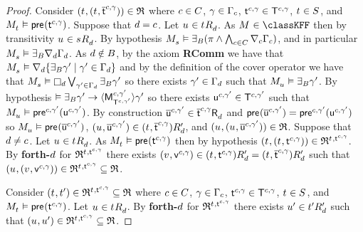 \begin{proof}
Consider $(\kStateT, (\kStateT, \aPStateT[\agentC, \gamma])) \in \refinement$ where $\agentC \in \agentsC$, $\gamma \in \Gamma_\agentC$, $\aStateT[\agentC, \gamma] \in \aStatesT[\agentC, \gamma]$, $\kStateT \in \kStates$, and $\kPModel{\kStateT} \entails \aPrecondition(\aStateT[\agentC, \gamma])$.
Suppose that $\agentD = \agentC$.
Let $\kStateU \in \kSuccessorsD{\kStateT}$.
As $\kModel \in \classKFF$ then by transitivity $\kStateU \in \kSuccessorsD{\kStateS}$.
By hypothesis $\kPModel{\kStateS} \entails \someactsBs (\pi \land \bigwedge_{\agentC \in \agentsC} \coversC \Gamma_\agentC)$, and in particular $\kPModel{\kStateS} \entails \someactsBs \coversD \Gamma_\agentD$.
As $\agentD \notin \agentsB$, by the \axiomAamlKFF{} axiom {\bf RComm} we have that $\kPModel{\kStateS} \entails \coversD \{\someactsBs \gamma' \mid \gamma' \in \Gamma_\agentD\}$ and by the definition of the cover operator we have that $\kPModel{\kStateS} \entails \necessaryD \bigvee_{\gamma' \in \Gamma_\agentD} \someactsBs \gamma'$ so there exists $\gamma' \in \Gamma_\agentD$ such that $\kPModel{\kStateU} \entails \someactsBs \gamma'$.
By hypothesis $\entails \someactsBs \gamma' \implies \actionE{\aPModel[\agentC, \gamma']{\aStatesT[\agentC, \gamma']}} \gamma'$ so there exists $\aStateU[\agentC, \gamma'] \in \aStatesT[\agentC, \gamma']$ such that $\kPModel{\kStateU} \entails \aPrecondition[\agentC, \gamma'](\aStateU[\agentC, \gamma'])$.
By construction $\aPStateU[\agentC, \gamma'] \in \aSuccessorsD{\aPStateT[\agentC, \gamma]}$ and $\aPrecondition(\aPStateU[\agentC, \gamma']) = \aPrecondition[\agentC, \gamma'](\aStateU[\agentC, \gamma'])$ so $\kPModel{\kStateU} \entails \aPrecondition(\aPStateU[\agentC, \gamma'])$, $(\kStateU, \aPStateU[\agentC, \gamma']) \in \kSuccessorsPD{(\kStateT, \aPStateT[\agentC, \gamma])}$, and $(\kStateU, (\kStateU, \aPStateU[\agentC, \gamma'])) \in \refinement$.
Suppose that $\agentD \neq \agentC$.
Let $\kStateU \in \kSuccessorsD{\kStateT}$.
As $\kPModel{\kStateT} \entails \aPrecondition(\aStateT[\agentC, \gamma])$ then by hypothesis $(\kStateT, (\kStateT, \aStateT[\agentC, \gamma])) \in \refinement^{\kStateT, \aStateT[\agentC, \gamma]}$.
By {\bf forth-$\agentD$} for $\refinement^{\kStateT, \aStateT[\agentC, \gamma]}$ there exists $(\kStateV, \aStateV[\agentC, \gamma]) \in \kSuccessorsPD{(\kStateT, \aStateT[\agentC, \gamma])} = \kSuccessorsPD{(\kStateT, \aPStateT[\agentC, \gamma])}$ such that $(\kStateU, (\kStateV, \aStateV[\agentC, \gamma])) \in \refinement^{\kStateT, \aStateT[\agentC, \gamma]} \subseteq \refinement$.

Consider $(\kStateT, \kStateTP) \in \refinement^{\kStateT, \aStateT[\agentC, \gamma]} \subseteq \refinement$ where $\agentC \in \agentsC$, $\gamma \in \Gamma_\agentC$, $\aStateT[\agentC, \gamma] \in \aStatesT[\agentC, \gamma]$, $\kStateT \in \kStates$, and $\kPModel{\kStateT} \entails \aPrecondition(\aStateT[\agentC, \gamma])$.
Let $\kStateU \in \kSuccessorsD{\kStateT}$.
By {\bf forth-$\agentD$} for $\refinement^{\kStateT, \aStateT[\agentC, \gamma]}$ there exists $\kStateUP \in \kSuccessorsPD{\kStateTP}$ such that $(\kStateU, \kStateUP) \in \refinement^{\kStateT, \aStateT[\agentC, \gamma]} \subseteq \refinement$.


\end{proof}
